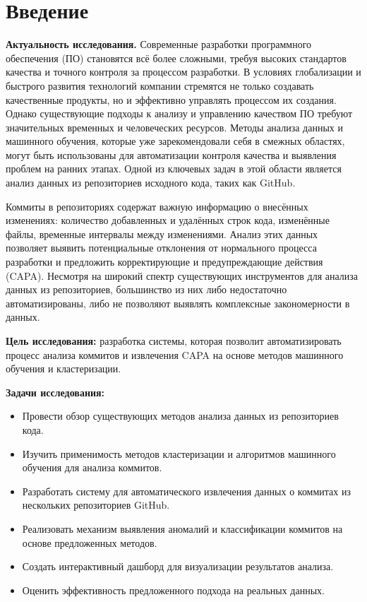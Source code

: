 \chapter*{Введение} %

\textbf{Актуальность исследования.} Современные разработки программного обеспечения (ПО) становятся всё более сложными, требуя высоких стандартов качества и точного контроля за процессом разработки. В условиях глобализации и быстрого развития технологий компании стремятся не только создавать качественные продукты, но и эффективно управлять процессом их создания. Однако существующие подходы к анализу и управлению качеством ПО требуют значительных временных и человеческих ресурсов. Методы анализа данных и машинного обучения, которые уже зарекомендовали себя в смежных областях, могут быть использованы для автоматизации контроля качества и выявления проблем на ранних этапах. Одной из ключевых задач в этой области является анализ данных из репозиториев исходного кода, таких как GitHub.

Коммиты в репозиториях содержат важную информацию о внесённых изменениях: количество добавленных и удалённых строк кода, изменённые файлы, временные интервалы между изменениями. Анализ этих данных позволяет выявить потенциальные отклонения от нормального процесса разработки и предложить корректирующие и предупреждающие действия (CAPA). Несмотря на широкий спектр существующих инструментов для анализа данных из репозиториев, большинство из них либо недостаточно автоматизированы, либо не позволяют выявлять комплексные закономерности в данных.

\textbf{Цель исследования:} разработка системы, которая позволит автоматизировать процесс анализа коммитов и извлечения CAPA на основе методов машинного обучения и кластеризации.

\textbf{Задачи исследования:}
\begin{itemize}
	\item Провести обзор существующих методов анализа данных из репозиториев кода.
	\item Изучить применимость методов кластеризации и алгоритмов машинного обучения для анализа коммитов.
	\item Разработать систему для автоматического извлечения данных о коммитах из нескольких репозиториев GitHub.
	\item Реализовать механизм выявления аномалий и классификации коммитов на основе предложенных методов.
	\item Создать интерактивный дашборд для визуализации результатов анализа.
	\item Оценить эффективность предложенного подхода на реальных данных.
\end{itemize}

